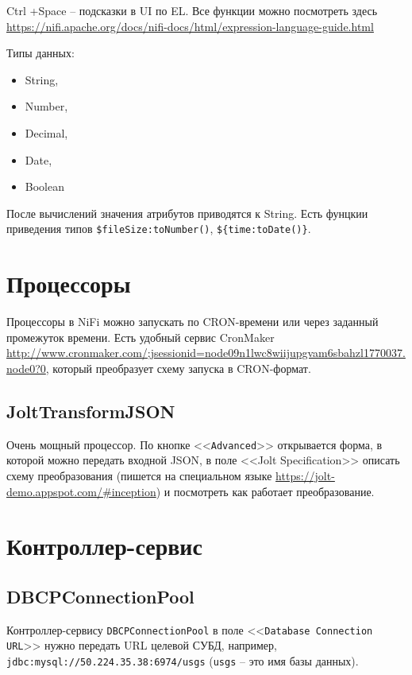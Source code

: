 \documentclass[%
	11pt,
	a4paper,
	utf8,
		]{article}
\begin{document}
Ctrl +Space -- подсказки в UI по EL. Все функции можно посмотреть здесь \url{https://nifi.apache.org/docs/nifi-docs/html/expression-language-guide.html}

Типы данных:
\begin{itemize}
	\item String,
	
	\item Number, 
	
	\item Decimal,
	
	\item Date,
	
	\item Boolean
\end{itemize}

После вычислений значения атрибутов приводятся к String. Есть фунцкии приведения типов \verb*|$fileSize:toNumber()|, \verb*|${time:toDate()}|.

\section{Процессоры}

Процессоры в NiFi можно запускать по CRON-времени или через заданный промежуток времени. Есть удобный сервис CronMaker \url{http://www.cronmaker.com/;jsessionid=node09n1lwc8wiijupgvam6sbahzl1770037.node0?0}, который преобразует схему запуска в CRON-формат.

\subsection{JoltTransformJSON}

Очень мощный процессор. По кнопке <<\verb*|Advanced|>> открывается форма, в которой можно передать входной JSON, в поле <<Jolt Specification>> описать схему преобразования (пишется на специальном языке \url{https://jolt-demo.appspot.com/#inception}) и посмотреть как работает преобразование.


\section{Контроллер-сервис}

\subsection{DBCPConnectionPool}

Контроллер-сервису \verb*|DBCPConnectionPool| в поле <<\verb|Database Connection URL|>> нужно передать URL целевой СУБД, например, \verb*|jdbc:mysql://50.224.35.38:6974/usgs| (\verb*|usgs| -- это имя базы данных).
\end{document}
